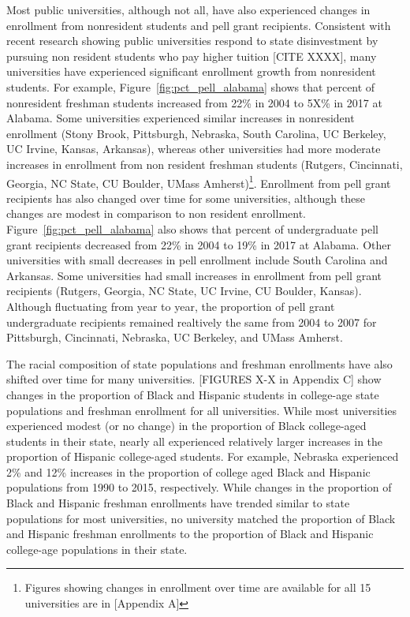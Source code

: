 \documentclass[twoside]{article}
\begin{document}
Most public universities, although not all, have also experienced changes in enrollment from nonresident students and pell grant recipients. Consistent with recent research showing public universities respond to state disinvestment by pursuing non resident students who pay higher tuition [CITE XXXX], many universities have experienced significant enrollment growth from nonresident students. For example, Figure~\ref{fig:pct_pell_alabama} shows that percent of nonresident freshman students increased from 22\% in 2004 to 5X\% in 2017 at Alabama. Some universities experienced similar increases in nonresident enrollment (Stony Brook, Pittsburgh, Nebraska, South Carolina, UC Berkeley, UC Irvine, Kansas, Arkansas), whereas other universities had more moderate increases in enrollment from non resident freshman students (Rutgers, Cincinnati, Georgia, NC State, CU Boulder, UMass Amherst)\footnote{Figures showing changes in enrollment over time are available for all 15 universities are in [Appendix A]}. Enrollment from pell grant recipients has also changed over time for some universities, although these changes are modest in comparison to non resident enrollment. Figure~\ref{fig:pct_pell_alabama} also shows that percent of undergraduate pell grant recipients decreased from 22\% in 2004 to 19\% in 2017 at Alabama. Other universities with small decreases in pell enrollment include South Carolina and Arkansas.  Some universities had small increases in enrollment from pell grant recipients (Rutgers, Georgia, NC State, UC Irvine, CU Boulder, Kansas). Although fluctuating from year to year, the proportion of pell grant undergraduate recipients remained realtively the same from 2004 to 2007 for Pittsburgh, Cincinnati, Nebraska, UC Berkeley, and UMass Amherst. 


The racial composition of state populations and freshman enrollments have also shifted over time for many universities. [FIGURES X-X in Appendix C] show changes in the proportion of Black and Hispanic students in college-age state populations and freshman enrollment for all universities. While most universities experienced modest (or no change) in the proportion of Black college-aged students in their state, nearly all experienced relatively larger increases in the proportion of Hispanic college-aged students. For example, Nebraska experienced 2\% and 12\% increases in the proportion of college aged Black and Hispanic populations from 1990 to 2015, respectively. While changes in the proportion of Black and Hispanic freshman enrollments have trended similar to state populations for most universities, no university matched the proportion of Black and Hispanic freshman enrollments to the proportion of Black and Hispanic college-age populations in their state.  
\end{document}
